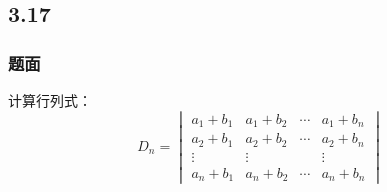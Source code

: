 \documentclass[10pt,xcolor=svgnames]{beamer} %
\begin{document}
\subsection*{3.17}
\begin{frame}
    \frametitle{题面}
    计算行列式：
    \begin{equation*}
        D_n=
        \begin{vmatrix}
            a_{1}+b_{1} & a_{1}+b_{2} & \cdots & a_{1}+b_{n} \\
            a_{2}+b_{1} & a_{2}+b_{2} & \cdots & a_{2}+b_{n} \\
            \vdots      & \vdots      &        & \vdots      \\
            a_{n}+b_{1} & a_{n}+b_{2} & \cdots & a_{n}+b_{n}
        \end{vmatrix}
    \end{equation*}
\end{frame}
\end{document}
